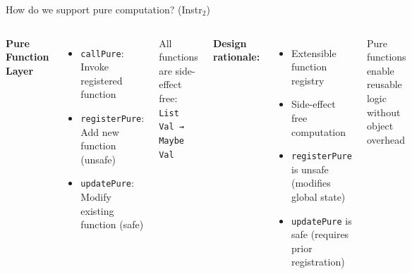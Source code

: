 \documentclass[handout,aspectratio=169,xcolor=dvipsnames,10pt]{beamer}
\begin{document}

\begin{frame}{How do we support pure computation? (Instr$_2$)}

\begin{columns}[T]
\textbf{Pure Function Layer}

\vspace{0.5em}

\begin{itemize}
  \item \texttt{callPure}: Invoke registered function
  \item \texttt{registerPure}: Add new function (unsafe)
  \item \texttt{updatePure}: Modify existing function (safe)
\end{itemize}

\vspace{0.5em}

{\small All functions are side-effect free: \texttt{List Val → Maybe Val}}


\textbf{Design rationale:}

\begin{itemize}\small
  \item Extensible function registry
  \item Side-effect free computation
  \item \texttt{registerPure} is unsafe (modifies global state)
  \item \texttt{updatePure} is safe (requires prior registration)
\end{itemize}

\vspace{0.5em}

{\scriptsize Pure functions enable reusable logic without object overhead}

\end{columns}

\end{frame}

\end{document}
